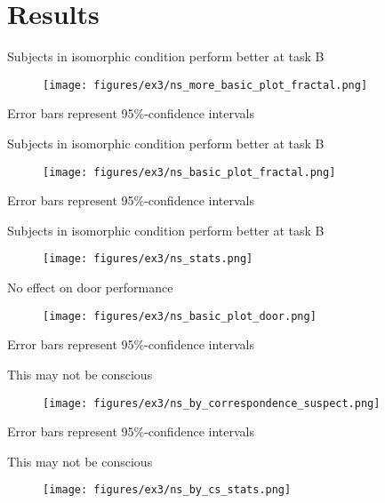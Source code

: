 \documentclass{beamer}
\begin{document}
\section{Results}
\begin{frame}{Subjects in isomorphic condition perform better at task B}
\begin{figure}
\centering
\texttt{[image: figures/ex3/ns\_more\_basic\_plot\_fractal.png]}
\end{figure}
{\scriptsize Error bars represent 95\%-confidence intervals}
\end{frame}

\begin{frame}{Subjects in isomorphic condition perform better at task B}
\begin{figure}
\centering
\texttt{[image: figures/ex3/ns\_basic\_plot\_fractal.png]}
\end{figure}
{\scriptsize Error bars represent 95\%-confidence intervals}
\end{frame}

\begin{frame}{Subjects in isomorphic condition perform better at task B}
\begin{figure}
\centering
\texttt{[image: figures/ex3/ns\_stats.png]}
\end{figure}
\end{frame}

\begin{frame}{No effect on door performance}
\begin{figure}
\centering
\texttt{[image: figures/ex3/ns\_basic\_plot\_door.png]}
\end{figure}
{\scriptsize Error bars represent 95\%-confidence intervals}
\end{frame}

\begin{frame}{This may not be conscious}
\begin{figure}
\centering
\texttt{[image: figures/ex3/ns\_by\_correspondence\_suspect.png]}
\end{figure}
\vspace{-5pt}
{\scriptsize Error bars represent 95\%-confidence intervals}
\end{frame}

\begin{frame}{This may not be conscious}
\begin{figure}
\centering
\texttt{[image: figures/ex3/ns\_by\_cs\_stats.png]}
\end{figure}
\end{frame}
\end{document}
